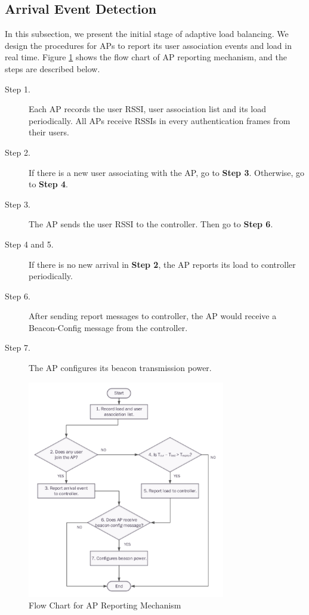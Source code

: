 \subsection{Arrival Event Detection}\label{section:3.2}
In this subsection, we present the initial stage of adaptive load balancing. We design the procedures for APs to report its user association events and load in real time. Figure \ref{fig:flowdiagram_trendindicator_ap} shows the flow chart of AP reporting mechanism, and the steps are described below.

\begin{description}
  \item [Step 1.] Each AP records the user RSSI, user association list and its load periodically. All APs receive RSSIs in every authentication frames from their users.
  \item [Step 2.] If there is a new user associating with the AP, go to \textbf{Step 3}. Otherwise, go to \textbf{Step 4}.
  \item [Step 3.] The AP sends the user RSSI to the controller. Then go to \textbf{Step 6}.
  \item [Step 4 and 5.] If there is no new arrival in \textbf{Step 2}, the AP reports its load to controller periodically.
  \item [Step 6.] After sending report messages to controller, the AP would receive a Beacon-Config message from the controller.
  \item [Step 7.] The AP configures its beacon transmission power.
\end{description}
\begin{figure}[tbp]
\centering
\includegraphics[width=3.4in]{images/flowdiagram_trendindicator_ap.pdf}
\caption{Flow Chart for AP Reporting Mechanism}
\label{fig:flowdiagram_trendindicator_ap}
\end{figure}
